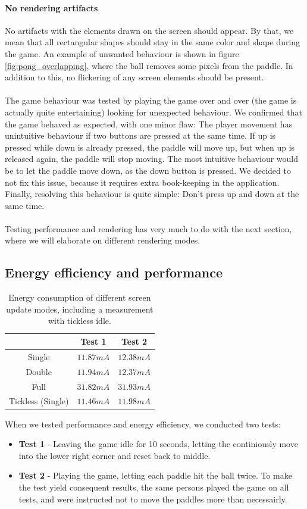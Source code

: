 \paragraph{No rendering artifacts}
No artifacts with the elements drawn on the screen should appear. By that, we mean that all rectangular shapes should stay in the same color and shape during the game. An example of unwanted behaviour is shown in figure \ref{fig:pong_overlapping}, where the ball removes some pixels from the paddle. In addition to this, no flickering of any screen elements should be present. \\
\\
The game behaviour was tested by playing the game over and over (the game is actually quite entertaining) looking for unexpected behaviour. We confirmed that the game behaved as expected, with one minor flaw: The player movement has unintuitive behaviour if two buttons are pressed at the same time. If up is pressed while down is already pressed, the paddle will move up, but when up is released again, the paddle will stop moving. The most intuitive behaviour would be to let the paddle move down, as the down button is pressed. We decided to not fix this issue, because it requires extra book-keeping in the application. Finally, resolving this behaviour is quite simple: Don't press up and down at the same time.\\
\\
Testing performance and rendering has very much to do with the next section, where we will elaborate on different rendering modes.

\subsection{Energy efficiency and performance}
\begin{table}
	\label{table:energy_consumption}
	\centering
	\begin{tabular}{c|c|c}
		\hline
		\hline
		& Test 1 & Test 2\\
		\hline
		Single & $11.87mA$ & $12.38mA$ \\
		Double & $11.94mA$ & $12.37mA$ \\
		Full & $31.82mA$ & $31.93mA$ \\
		\hline
		Tickless (Single) & $11.46mA$ & $11.98mA$ \\
		\hline
		
	
	\end{tabular}
	\caption{Energy consumption of different screen update modes, including a measurement with tickless idle.}
\end{table}
When we tested performance and energy efficiency, we conducted two tests:
\begin{itemize}
	\item \textbf{Test 1}  - Leaving the game idle for 10 seconds, letting the continiously move into the lower right corner and reset back to middle.
	\item \textbf{Test 2} - Playing the game, letting each paddle hit the ball twice. To make the test yield consequent results, the same persons played the game on all tests, and were instructed not to move the paddles more than necessairly.
\end{itemize}

